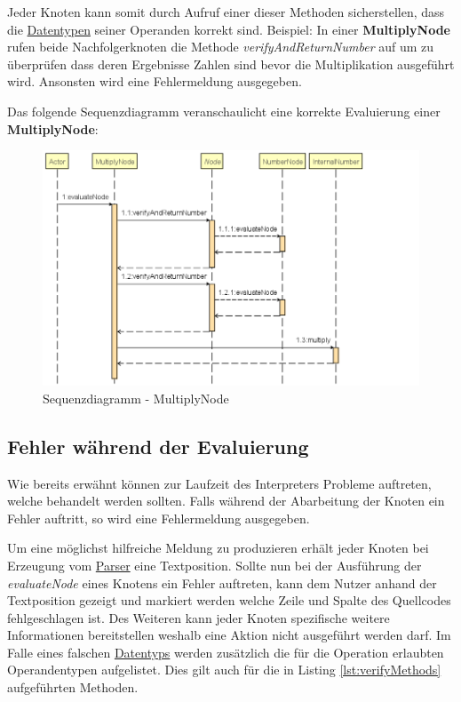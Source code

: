 Jeder Knoten kann somit durch Aufruf einer dieser Methoden sicherstellen, dass die \underline{Datentypen} seiner Operanden korrekt sind. Beispiel: In einer \textbf{MultiplyNode} rufen beide Nachfolgerknoten die Methode \textit{verifyAndReturnNumber} auf um zu überprüfen dass deren Ergebnisse Zahlen sind bevor die Multiplikation ausgeführt wird. Ansonsten wird eine Fehlermeldung ausgegeben. 

Das folgende Sequenzdiagramm veranschaulicht eine korrekte Evaluierung einer \textbf{MultiplyNode}:
\begin{figure}[H]
\centering
	\includegraphics[width=1.1\textwidth]{images/MultiplySequenz.png}\par\vspace{0.5cm}
	\caption{Sequenzdiagramm - MultiplyNode}
\end{figure}


\subsection{Fehler während der Evaluierung}
\label{Fehlermeldungen}
Wie bereits erwähnt können zur Laufzeit des Interpreters Probleme auftreten, welche behandelt werden sollten. 
Falls während der Abarbeitung der Knoten ein Fehler auftritt, so wird eine Fehlermeldung ausgegeben. 

Um eine möglichst hilfreiche Meldung zu produzieren erhält jeder Knoten bei Erzeugung vom \underline{Parser} eine Textposition. Sollte nun bei der Ausführung der \textit{evaluateNode} eines Knotens ein Fehler auftreten, kann dem Nutzer anhand der Textposition gezeigt und markiert werden welche Zeile und Spalte des Quellcodes fehlgeschlagen ist. Des Weiteren kann jeder Knoten spezifische weitere Informationen bereitstellen weshalb eine Aktion nicht ausgeführt werden darf. Im Falle eines falschen \underline{Datentyps} werden zusätzlich die für die Operation erlaubten Operandentypen aufgelistet. Dies gilt auch für die in Listing \ref{lst:verifyMethods} aufgeführten Methoden.
